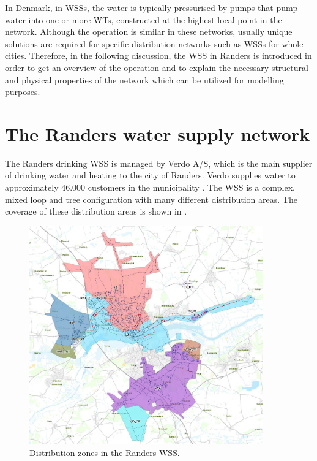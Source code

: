 In Denmark, in WSSs, the water is typically pressurised by pumps that pump water into one or more WTs, constructed at the highest local point in the network. Although the operation is similar in these networks, usually unique solutions are required for specific distribution networks such as WSSs for whole cities. Therefore, in the following discussion, the WSS in Randers is introduced in order to get an overview of the operation and to explain the necessary structural and physical properties of the network which can be utilized for modelling purposes. 

\newpage

\section{The Randers water supply network}
\label{the_randers_water_supply_network}

The Randers drinking WSS is managed by Verdo A/S, which is the main supplier of drinking water and heating to the city of Randers. Verdo supplies water to approximately 46.000 customers in the municipality \cite{verdo}. The WSS is a complex, mixed loop and tree configuration with many different distribution areas. The coverage of these distribution areas is shown in .

\begin{figure}[H]
\centering
\includegraphics[width=0.9\textwidth]{report/pictures/level_zones}
\caption{Distribution zones in the Randers WSS.}
\label{fig:level_zones}
\end{figure}

